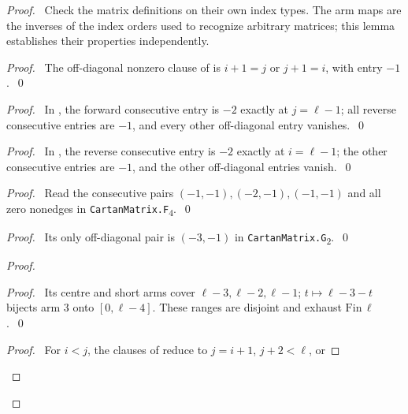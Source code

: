 \begin{proof}
\pfsketch\ Check the matrix definitions on their own index types.
The arm maps are the inverses of the index orders used to recognize
arbitrary matrices; this lemma establishes their properties independently.
\begin{proof}\pf\ The off-diagonal nonzero clause of
 is $i+1=j$ or $j+1=i$, with entry $-1$.~\qed\end{proof}
\begin{proof}\pf\ In , the forward consecutive
entry is $-2$ exactly at $j=\ell-1$; all reverse consecutive entries
are $-1$, and every other off-diagonal entry vanishes.~\qed\end{proof}
\begin{proof}\pf\ In , the reverse consecutive
entry is $-2$ exactly at $i=\ell-1$; the other consecutive entries
are $-1$, and the other off-diagonal entries vanish.~\qed\end{proof}
\begin{proof}\pf\ Read the consecutive pairs $(-1,-1),(-2,-1),(-1,-1)$
and all zero nonedges in \texttt{CartanMatrix.F}\textsubscript{4}.~\qed\end{proof}
\begin{proof}\pf\ Its only off-diagonal pair is $(-3,-1)$ in
\texttt{CartanMatrix.G}\textsubscript{2}.~\qed\end{proof}
\begin{proof}
\begin{proof}\pf\ Its centre and short arms cover $\ell-3,\ell-2,\ell-1$;
$t\mapsto\ell-3-t$ bijects arm 3 onto $[0,\ell-4]$.
These ranges are disjoint and exhaust $\mathrm{Fin}\,\ell$.~\qed\end{proof}
\begin{proof}\pf\ For $i<j$, the clauses of 
reduce to $j=i+1$, $j+2<\ell$, or

\end{proof}
\end{proof}
\end{proof}
